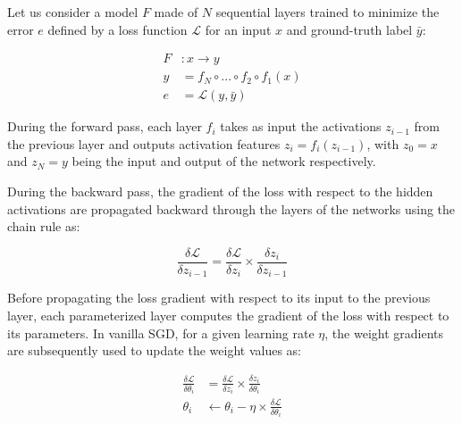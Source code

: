 \documentclass[twocolumn]{bmcart}
\begin{document}
Let us consider a model $F$ made of $N$ sequential layers trained to minimize the error $e$ defined by a loss function $\mathcal{L}$ for an input $x$ and ground-truth label $\bar{y}$:

 \begin{subequations}
 	\begin{align}
 	F &: x \rightarrow y \\
 	y &= f_N \circ ... \circ f_2 \circ f_1(x) \\
 	e &=  \mathcal{L}(y, \bar{y})
 	\end{align}
 \end{subequations}

During the forward pass, each layer $f_i$ takes as input the activations $z_{i-1}$ from the previous layer and outputs activation features $z_i=f_i(z_{i-1})$, with $z_0=x$ and $z_N=y$ being the input and output of the network respectively.

During the backward pass, the gradient of the loss with respect to the hidden activations are propagated backward through the layers of the networks using the chain rule as:


\begin{equation}
\frac{\delta \mathcal{L}}{\delta z_{i-1}} = \frac{\delta \mathcal{L}}{\delta z_{i}}  \times \frac{\delta z_{i}}{\delta z_{i-1}}
\end{equation}

Before propagating the loss gradient with respect to its input to the previous layer, 
each parameterized layer computes the gradient of the loss with respect to its parameters. 
In vanilla SGD, for a given learning rate $\eta$, the weight gradients are subsequently used to update the weight values as:

\begin{subequations}
\begin{align}
\frac{\delta \mathcal{L}}{\delta \theta_i} & =\frac{\delta \mathcal{L}}{\delta z_{i}}  \times \frac{\delta z_{i}}{\delta \theta_i} \\
\theta_i & \leftarrow \theta_i - \eta \times \frac{\delta \mathcal{L}}{\delta \theta_i}
\end{align}
\end{subequations}
\end{document}
